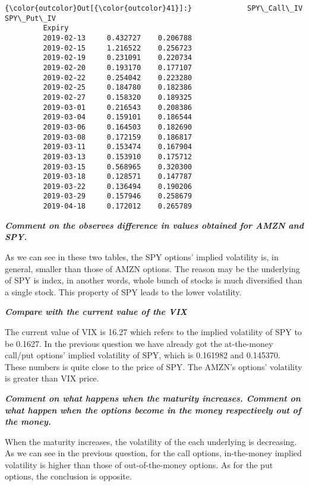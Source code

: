 \documentclass[11pt]{article}
\begin{document}
\begin{Verbatim}[commandchars=\\\{\}]
{\color{outcolor}Out[{\color{outcolor}41}]:}             SPY\_Call\_IV  SPY\_Put\_IV
         Expiry                             
         2019-02-13     0.432727    0.206788
         2019-02-15     1.216522    0.256723
         2019-02-19     0.231091    0.220734
         2019-02-20     0.193170    0.177107
         2019-02-22     0.254042    0.223280
         2019-02-25     0.184780    0.182386
         2019-02-27     0.158320    0.189325
         2019-03-01     0.216543    0.208386
         2019-03-04     0.159101    0.186544
         2019-03-06     0.164503    0.182690
         2019-03-08     0.172159    0.186817
         2019-03-11     0.153474    0.167904
         2019-03-13     0.153910    0.175712
         2019-03-15     0.568965    0.320300
         2019-03-18     0.128571    0.147787
         2019-03-22     0.136494    0.190206
         2019-03-29     0.157946    0.258679
         2019-04-18     0.172012    0.265789
\end{Verbatim}
            
    \textbf{\emph{Comment on the observes difference in values obtained for
AMZN and SPY.}}

As we can see in these two tables, the SPY options' implied volatility
is, in general, smaller than those of AMZN options. The reason may be
the underlying of SPY is index, in another words, whole bunch of stocks
is much diversified than a single stock. This property of SPY leads to
the lower volatility.

\textbf{\emph{Compare with the current value of the VIX}}

The current value of VIX is 16.27 which refers to the implied volatility
of SPY to be 0.1627. In the previous question we have already got the
at-the-money call/put options' implied volatility of SPY, which is
0.161982 and 0.145370. These numbers is quite close to the price of SPY.
The AMZN's options' volatility is greater than VIX price.

\textbf{\emph{Comment on what happens when the maturity increases.
Comment on what happen when the options become in the money respectively
out of the money.}}

When the maturity increases, the volatility of the each underlying is
decreasing. As we can see in the previous question, for the call
options, in-the-money implied volatility is higher than those of
out-of-the-money options. As for the put options, the conclusion is
opposite.
\end{document}
